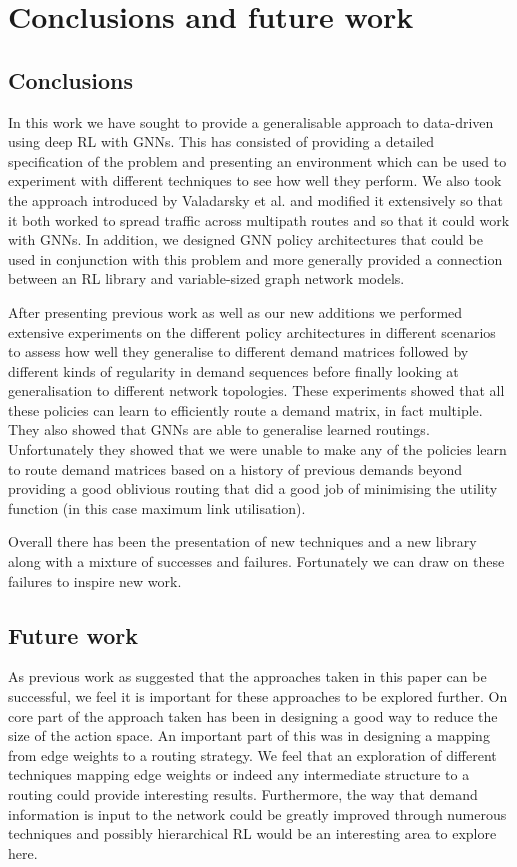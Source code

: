 \chapter{Conclusions and future work}
\label{chapter:conclusions}

\section{Conclusions}
In this work we have sought to provide a generalisable approach to data-driven using deep RL with GNNs. This has consisted of providing a detailed specification of the problem and presenting an environment which can be used to experiment with different techniques to see how well they perform. We also took the approach introduced by Valadarsky et al. and modified it extensively so that it both worked to spread traffic across multipath routes and so that it could work with GNNs. In addition, we designed GNN policy architectures that could be used in conjunction with this problem and more generally provided a connection between an RL library and variable-sized graph network models.

After presenting previous work as well as our new additions we performed extensive experiments on the different policy architectures in different scenarios to assess how well they generalise to different demand matrices followed by different kinds of regularity in demand sequences before finally looking at generalisation to different network topologies. These experiments showed that all these policies can learn to efficiently route a demand matrix, in fact multiple. They also showed that GNNs are able to generalise learned routings. Unfortunately they showed that we were unable to make any of the policies learn to route demand matrices based on a history of previous demands beyond providing a good oblivious routing that did a good job of minimising the utility function (in this case maximum link utilisation).

Overall there has been the presentation of new techniques and a new library along with a mixture of successes and failures. Fortunately we can draw on these failures to inspire new work.


\section{Future work}
As previous work as suggested that the approaches taken in this paper can be successful, we feel it is important for these approaches to be explored further. On core part of the approach taken has been in designing a good way to reduce the size of the action space. An important part of this was in designing a mapping from edge weights to a routing strategy. We feel that an exploration of different techniques mapping edge weights or indeed any intermediate structure to a routing could provide interesting results. Furthermore, the way that demand information is input to the network could be greatly improved through numerous techniques and possibly hierarchical RL would be an interesting area to explore here.

